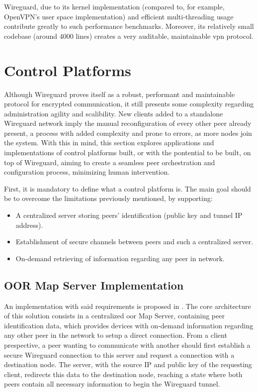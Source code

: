 \documentclass[11pt,twoside,a4paper]{report}
\begin{document}
Wireguard, due to its kernel implementation (compared to, for example, OpenVPN's user space implementation) and efficient multi-threading usage contribute greatly to such performance benchmarks. Moreover, its relatively small codebase (around 4000 lines) creates a very auditable, maintainable \acrshort{vpn} protocol.


\section{Control Platforms}

Although Wireguard proves itself as a robust, performant and maintainable protocol for encrypted communication, it still presents some complexity regarding administration agility and scalibility. New clients added to a standalone Wireguard network imply the manual reconfiguration of every other peer already present, a process with added complexity and prone to errors, as more nodes join the system. With this in mind, this section explores applications and implementations of control platforms built, or with the pontential to be built, on top of Wireguard, aiming to create a seamless peer orchestration and configuration process, minimizing human intervention.

First, it is mandatory to define what a control platform is. The main goal should be to overcome the limitations previously mentioned, by supporting:

\begin{itemize}
     \item A centralized server storing peers' identification (public key and tunnel IP address).
     \item Establishment of secure channels between peers and such a centralized server.
     \item On-demand retrieving of information regarding any peer in network.
\end{itemize}

\subsection{OOR Map Server Implementation}

An implementation with said requirements is proposed in \cite{paillisse2021control}. The core architecture of this solution consists in a centralized \acrlong{oor} Map Server, containing peer identification data, which provides devices with on-demand information regarding any other peer in the network to setup a direct connection.  From a client prespective, a peer wanting to communicate with another should first establish a secure Wireguard connection to this server and request a connection with a destination node. The server, with the source IP and public key of the requesting client, redirects this data to the destination node, reaching a state where both peers contain all necessary information to begin the Wireguard tunnel.
\end{document}

